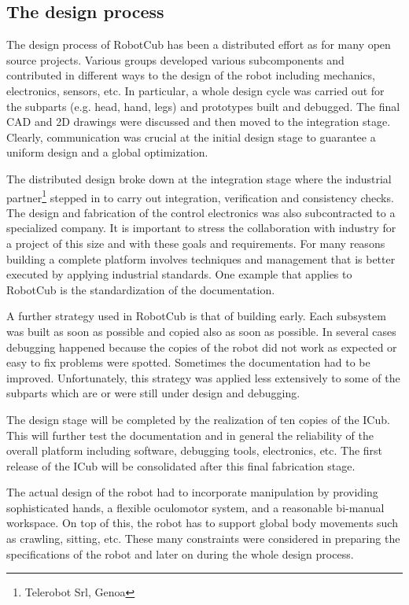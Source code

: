 \subsection{The design process}
The design process of RobotCub has been a distributed effort as for many open
source projects. Various groups developed various subcomponents and contributed in
different ways to the design of the robot including mechanics, electronics, sensors, 
etc. In particular, a whole design cycle was carried out for the subparts (e.g.
head, hand, legs) and prototypes built and debugged. The final CAD and 2D drawings 
were discussed and then moved to the integration stage. Clearly, communication
was crucial at the initial design stage to guarantee a uniform design and a
global optimization.

The distributed design broke down at the integration stage where the industrial 
partner\footnote{Telerobot Srl, Genoa} stepped in to carry out integration, 
verification and consistency checks. The design and fabrication of the control 
electronics was also subcontracted to a specialized company.
It is important to stress the collaboration with industry for a project of this
size and with these goals and requirements. For many reasons building a complete 
platform involves techniques and management that is better executed by applying 
industrial standards. One example that applies to RobotCub is the standardization 
of the documentation.

A further strategy used in RobotCub is that of building early. Each subsystem
was built as soon as possible and copied also as soon as possible. In several cases
debugging happened because the copies of the robot did not work as expected or
easy to fix problems were spotted. Sometimes the documentation had to be improved.
Unfortunately, this strategy was applied less extensively to some of the subparts 
which are or were still under design and debugging. 

The design stage will be completed by the realization of ten copies of the ICub.
This will further test the documentation and in general the reliability of the
overall platform including software, debugging tools, electronics, etc. The first
release of the ICub will be consolidated after this final fabrication stage.

The actual design of the robot had to incorporate manipulation by providing 
sophisticated hands, a flexible oculomotor system, and a reasonable bi-manual 
workspace. On top of this, the robot has to support global body movements such as 
crawling, sitting, etc. These many constraints were considered in preparing 
the specifications of the robot and later on during the whole design process.

